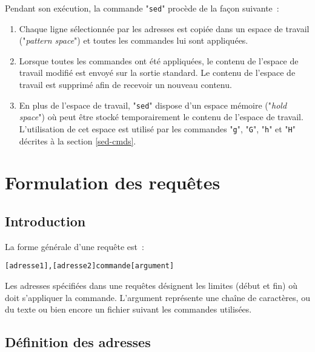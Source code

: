 Pendant son ex{\'e}cution, la commande "{\tt sed}" proc{\`e}de de la fa\c{c}on
suivante~:
\begin{enumerate}
	\item	Chaque ligne s{\'e}lectionn{\'e}e par les adresses est copi{\'e}e dans un
			espace de travail ("{\sl pattern space}") et toutes les
			commandes lui sont appliqu{\'e}es.
	\item	Lorsque toutes les commandes ont {\'e}t{\'e} appliqu{\'e}es, le contenu
			de l'espace de travail modifi{\'e} est envoy{\'e} sur la sortie
			standard. Le contenu de l'espace de travail est supprim{\'e} afin
			de recevoir un nouveau contenu.
	\item	En plus de l'espace de travail, "{\tt sed}" dispose d'un espace m{\'e}moire
			("{\sl hold space}") o{\`u} peut {\^e}tre stock{\'e} temporairement
			le contenu de l'espace de travail. L'utilisation de cet espace
			est utilis{\'e} par les commandes "{\tt g}", "{\tt G}",
			"{\tt h}" et "{\tt H}" d{\'e}crites {\`a} la section
			\ref{sed-cmds}.
\end{enumerate}

\section{Formulation des requ{\^e}tes}

\subsection{Introduction}

La forme g{\'e}n{\'e}rale d'une requ{\^e}te est~:
\begin{center}
\begin{verbatim}
[adresse1],[adresse2]commande[argument]
\end{verbatim}
\end{center}

Les adresses sp{\'e}cifi{\'e}es dans une requ{\^e}tes d{\'e}signent les limites
(d{\'e}but et fin) o{\`u} doit s'appliquer la  commande. L'argument repr{\'e}sente
une cha{\^i}ne de caract{\`e}res, ou du texte ou bien encore un fichier suivant les
commandes utilis{\'e}es.

\subsection{\label{sed-def-addr}D{\'e}finition des adresses}

